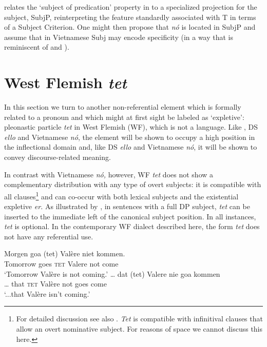 \documentclass[output=paper]{LSP/langsci}
\begin{document}
\citet{Rizzi2006} relates the ‘subject of predication’ property in  to a specialized projection for the subject, SubjP, reinterpreting the  feature standardly associated with T in terms of a Subject Criterion. One might then propose that \textit{nó} is located in SubjP and assume that in Vietnamese Subj may encode specificity (in a way that is reminiscent of \citealt{Kiss1996} and \citealt{Cardinaletti2004}).

\section{West Flemish \textit{tet}}\label{sec:Greco:5}

In this section we turn to another non-referential element which is formally related to a pronoun and which might at first sight be labeled as ‘expletive’: pleonastic particle \textit{tet} in West Flemish (WF), which is not a  language. Like  , DS \textit{ello} and Vietnamese \textit{nó}, the element will be shown to occupy a high position in the inflectional domain and, like DS \textit{ello} and Vietnamese \textit{nó}, it will be shown to convey discourse-related meaning.

In contrast with Vietnamese \textit{nó}\textit{,} however, WF \textit{tet} does not show a complementary distribution with any type of overt subjects: it is compatible with all  clauses\footnote{ For detailed discussion see also \citealt{Haegeman2008}. \textit{Tet} is compatible with infinitival clauses that allow an overt nominative subject. For reasons of space we cannot discuss this here.} and can co-occur with both lexical subjects and the existential expletive \textit{er.} As illustrated by , in  sentences with a full DP subject, \textit{tet} can be inserted to the immediate left of the canonical subject position. In all instances, \textit{tet} is optional. In the contemporary WF dialect described here, the form \textit{tet} does not have any referential use.

\settowidth{}
\ea%
    \label{ex:Greco:26}
    \ea \gll Morgen   goa (tet)  Valère niet kommen.\\
    	    Tomorrow   goes \textsc{tet}   Valere not come\\
             \glt `Tomorrow Valère is not coming.'
	\ex \gll … dat      (tet)    Valere nie goa kommen\\
		     … that    \textsc{tet}    Valère not goes come\\
            \glt `...that Valère isn't coming.'
    \z
\z
\end{document}
